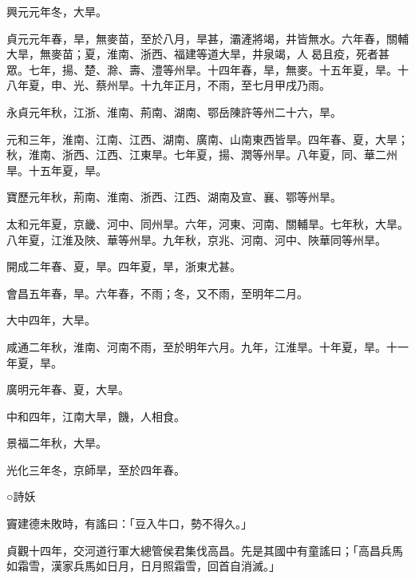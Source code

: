 \begin{pinyinscope}
 興元元年冬，大旱。



 貞元元年春，旱，無麥苗，至於八月，旱甚，灞滻將竭，井皆無水。六年春，關輔大旱，無麥苗；夏，淮南、浙西、福建等道大旱，井泉竭，人曷且疫，死者甚眾。七年，揚、楚、滁、壽、澧等州旱。十四年春，旱，無麥。十五年夏，旱。十八年夏，申、光、蔡州旱。十九年正月，不雨，至七月甲戌乃雨。



 永貞元年秋，江浙、淮南、荊南、湖南、鄂岳陳許等州二十六，旱。



 元和三年，淮南、江南、江西、湖南、廣南、山南東西皆旱。四年春、夏，大旱；秋，淮南、浙西、江西、江東旱。七年夏，揚、潤等州旱。八年夏，同、華二州旱。十五年夏，旱。



 寶歷元年秋，荊南、淮南、浙西、江西、湖南及宣、襄、鄂等州旱。



 太和元年夏，京畿、河中、同州旱。六年，河東、河南、關輔旱。七年秋，大旱。八年夏，江淮及陜、華等州旱。九年秋，京兆、河南、河中、陜華同等州旱。



 開成二年春、夏，旱。四年夏，旱，浙東尤甚。



 會昌五年春，旱。六年春，不雨；冬，又不雨，至明年二月。



 大中四年，大旱。



 咸通二年秋，淮南、河南不雨，至於明年六月。九年，江淮旱。十年夏，旱。十一年夏，旱。



 廣明元年春、夏，大旱。



 中和四年，江南大旱，饑，人相食。



 景福二年秋，大旱。



 光化三年冬，京師旱，至於四年春。



 ○詩妖



 竇建德未敗時，有謠曰：「豆入牛口，勢不得久。」



 貞觀十四年，交河道行軍大總管侯君集伐高昌。先是其國中有童謠曰；「高昌兵馬如霜雪，漢家兵馬如日月，日月照霜雪，回首自消滅。」




\end{pinyinscope}
